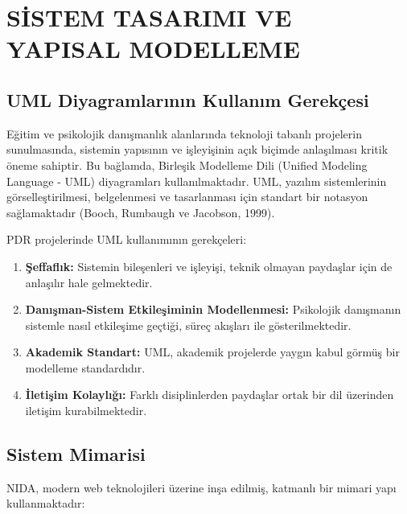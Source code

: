 
\chapter{SİSTEM TASARIMI VE YAPISAL MODELLEME}

\section{UML Diyagramlarının Kullanım Gerekçesi}

Eğitim ve psikolojik danışmanlık alanlarında teknoloji tabanlı projelerin sunulmasında, sistemin yapısının ve işleyişinin açık biçimde anlaşılması kritik öneme sahiptir. Bu bağlamda, Birleşik Modelleme Dili (Unified Modeling Language - UML) diyagramları kullanılmaktadır. UML, yazılım sistemlerinin görselleştirilmesi, belgelenmesi ve tasarlanması için standart bir notasyon sağlamaktadır (Booch, Rumbaugh ve Jacobson, 1999).

PDR projelerinde UML kullanımının gerekçeleri:

\begin{enumerate}
  \item \textbf{Şeffaflık:} Sistemin bileşenleri ve işleyişi, teknik olmayan paydaşlar için de anlaşılır hale gelmektedir.
  \item \textbf{Danışman-Sistem Etkileşiminin Modellenmesi:} Psikolojik danışmanın sistemle nasıl etkileşime geçtiği, süreç akışları ile gösterilmektedir.
  \item \textbf{Akademik Standart:} UML, akademik projelerde yaygın kabul görmüş bir modelleme standardıdır.
  \item \textbf{İletişim Kolaylığı:} Farklı disiplinlerden paydaşlar ortak bir dil üzerinden iletişim kurabilmektedir.
\end{enumerate}

\section{Sistem Mimarisi}

NIDA, modern web teknolojileri üzerine inşa edilmiş, katmanlı bir mimari yapı kullanmaktadır:

